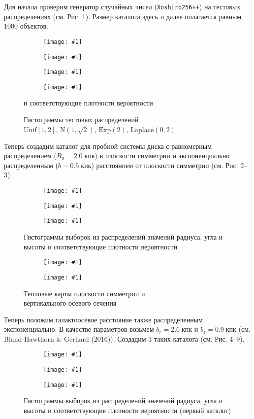 \documentclass[a4paper, oneside]{article}
\newlength{\imagewidth}
\newlength{\imageheight}
\newcommand{\subgraphics}[1]{
\settowidth{\imagewidth}{\texttt{[image: \#1]}}%
\begin{subfigure}{\imagewidth}%
    \texttt{[image: \#1]}%
\end{subfigure}%
}
\begin{document}
Для начала проверим генератор случайных чисел (\texttt{Xoshiro256++}) на тестовых распределениях (см. Рис. 1). Размер каталога здесь и далее полагается равным 1000 объектов.

\captionsetup{justification=centering}

\begin{figure}[h!]
  \centering
  \setlength{\imageheight}{4.65cm}
  \subgraphics{uniform/Histogram}
  \subgraphics{normal/Histogram}
  \subgraphics{exponential/Histogram}
  \subgraphics{laplace/Histogram}
  \caption{Гистограммы тестовых распределений \\ $ \mathrm{Unif}[1, 2] $, $ \mathrm{N}(1, \sqrt{2}) $, $ \mathrm{Exp}(2) $, $ \mathrm{Laplace}(0, 2) $} и соответствующие плотности вероятности
\end{figure}

Теперь создадим каталог для пробной системы диска с равномерным распределением ($ R_0 = 2.0 \; \text{кпк} $) в плоскости симметрии и экспоненциально распределенным ($ b = 0.5 \; \text{кпк} $) расстоянием от плоскости симметрии (см. Рис. 2--3).

\begin{figure}[h!]
  \centering
  \setlength{\imageheight}{4.07cm}
  \subgraphics{uniform_disk/2/Histogram R}
  \subgraphics{uniform_disk/2/Histogram θ}
  \subgraphics{uniform_disk/2/Histogram Z}
  \caption{Гистограммы выборок из распределений значений радиуса, угла и высоты и соответствующие плотности вероятности}
\end{figure}

\newpage

\begin{figure}[h!]
  \centering
  \setlength{\imageheight}{5.1cm}
  \subgraphics{uniform_disk/2/Heatmap Symmetry Plane}
  \subgraphics{uniform_disk/2/Heatmap Vertical Cut}
  \caption{Тепловые карты плоскости симметрии и \\ вертикального осевого сечения}
\end{figure}

Теперь положим галактоосевое расстояние также распределенным экспоненциально. В качестве параметров возьмем $ b_{r} = 2.6 \; \text{кпк} $ и $ b_{z} = 0.9 \; \text{кпк} $ (см. Bland-Hawthorn \& Gerhard (2016)). Создадим 3 таких каталога (см. Рис. 4--9).

\begin{figure}[h!]
  \centering
  \setlength{\imageheight}{4.07cm}
  \subgraphics{exponential_disk/1/Histogram R}
  \subgraphics{exponential_disk/1/Histogram θ}
  \subgraphics{exponential_disk/1/Histogram Z}
  \caption{Гистограммы выборок из распределений значений радиуса, угла и высоты и соответствующие плотности вероятности (первый каталог)}
\end{figure}
\end{document}
